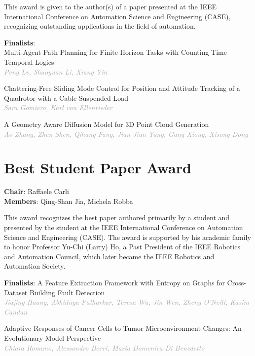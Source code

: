 \documentclass[
	openany, %
	parskip=full, %
	12pt, %
	a4paper, %
]{conferencebooklet} %
\begin{document}
\begin{multicols*}{2}
This award is given to the author(s) of a paper presented at the IEEE International Conference on Automation Science and Engineering (CASE), recognizing outstanding applications in the field of automation.

\textbf{Finalists}: \\
\small  Multi-Agent Path Planning for Finite Horizon Tasks with Counting Time Temporal Logics \\
\footnotesize \textit{\textcolor{darkgray}{Peng Lv, Shaoyuan Li, Xiang Yin}}

\small  Chattering-Free Sliding Mode Control for Position and Attitude Tracking of a Quadrotor with a Cable-Suspended Load \\
\footnotesize \textit{\textcolor{darkgray}{Sara Gomiero, Karl von Ellenrieder}}

\small A Geometry Aware Diffusion Model for 3D Point Cloud Generation \\
\footnotesize \textit{\textcolor{darkgray}{Ao Zhang, Zhen Shen, Qihang Fang, Jian Jian Yang, Gang Xiong, Xisong Dong}}

\normalsize

\section{Best Student Paper Award}
\textbf{Chair}: Raffaele Carli \\
\textbf{Members}: Qing-Shan Jia, Michela Robba 

This award recognizes the best paper authored primarily by a student and presented by the student at the IEEE International Conference on Automation Science and Engineering (CASE). The award is supported by his academic family to honor Professor Yu-Chi (Larry) Ho, a Past President of the IEEE Robotics and Automation Council, which later became the IEEE Robotics and Automation Society.

\textbf{Finalists}:
\small A Feature Extraction Framework with Entropy on Graphs for Cross-Dataset Building Fault Detection \\
\footnotesize \textit{\textcolor{darkgray}{Jiajing Huang, Abhidnya Patharkar, Teresa Wu, Jin Wen, Zheng O’Neill, Kasim Candan}}

\small Adaptive Responses of Cancer Cells to Tumor Microenvironment Changes: An Evolutionary Model Perspective \\
\footnotesize \textit{\textcolor{darkgray}{Chiara Romano, Alessandro Borri, Maria Domenica Di Benedetto}}


\end{multicols*}
\end{document}

